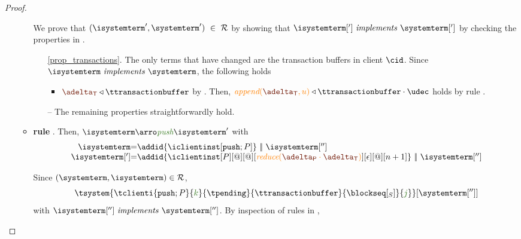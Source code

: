 \begin{proof}
\begin{itemize}
\begin{itemize}
				
				We  prove that $(\isystemterm',\systemterm') \ \in \ \mathcal{R}$ by showing that $\implements{\isystemterm[']}{\systemterm[']}$ 
				by checking the properties in .			
					\begin{enumerate}
						\item[\ref{prop_transactions}.] The only terms that have changed are the transaction buffers in client $\cid$. Since 
						$\implements{\isystemterm}{\systemterm}$, the following holds
						\begin{itemize}
							\item $\transactionbuffer \triangleleft{\ttransactionbuffer}$ by . 						
						Then, $\iappend{\transactionbuffer}{u} \triangleleft \ttransactionbuffer \cdot \tupdate$ holds by
						rule .

						\end{itemize}


						\item[{--}] The remaining properties straightforwardly hold.
						

					\end{enumerate}


\item {\bf rule }. Then, $\isystemterm  \arroi{\pushtran} \isystemterm '$ with 
				\[\begin{array}{r@{=}l}
					\isystemterm & \addid{\iclientinst[\tpushins]} \ \bigpar \ \isystemterm[''] 
					\\
					\isystemterm['] & {\addid{\iclientinst[P][@][@][\ireduce{\pushbuffer\cdot \transactionbuffer}][\epsilon][@][n+1]}\ \bigpar \ \isystemterm['']}
				  \end{array}
				\]
		
				Since $(\systemterm,\isystemterm)\in \mathcal{R}$,
				\[ \tsystem{\tclienti{\tpushins}{\tknown}{\tpending}{\ttransactionbuffer}{\tsent}{\treceivebuffer}}[{\systemterm['']}] \]
				with $\implements{\isystemterm['']}{\systemterm['']}$. By inspection of rules in , 


\end{itemize}
\end{itemize}
\end{proof}
